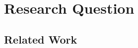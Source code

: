 \section{Research Question}
\label{sec:research-question}




\subsection{Related Work}
\label{sec:related-work}

%
%
%
%
%
%
